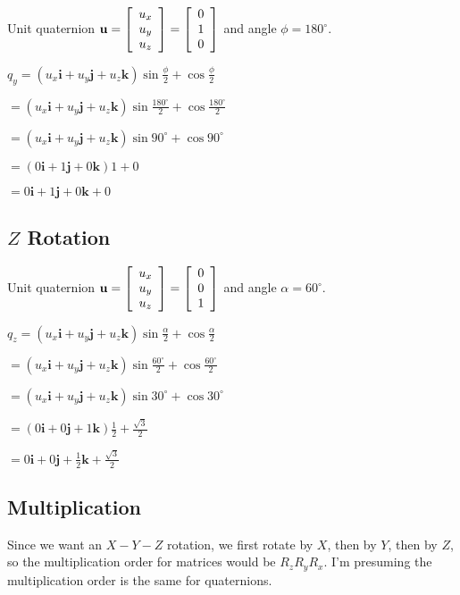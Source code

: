 \documentclass[11pt]{article}
\begin{document}
\begin{spacing}{1.2}
Unit quaternion 
$\displaystyle 
\mathbf{u} = 
\left[
	\begin{array}{c}
		u_x \cr u_y \cr u_z \cr
	\end{array}
\right]
= 
\left[
	\begin{array}{c}
		0 \cr 1 \cr 0 \cr
	\end{array}
\right]
$
and angle $\phi = 180^{\circ}$.

$q_y
 = (u_x \mathbf{i} + u_y \mathbf{j} + u_z \mathbf{k}) \sin \frac{\phi}{2} + \cos \frac{\phi}{2}
 $
 
 $ = (u_x \mathbf{i} + u_y \mathbf{j} + u_z \mathbf{k}) \sin \frac{180^{\circ}}{2} + \cos \frac{180^{\circ}}{2}$

 $ = (u_x \mathbf{i} + u_y \mathbf{j} + u_z \mathbf{k}) \sin 90^{\circ} + \cos 90^{\circ}$

 $ = (0 \mathbf{i} + 1\mathbf{j} + 0\mathbf{k}) 1 + 0$

 $ = 0 \mathbf{i} + 1\mathbf{j} + 0\mathbf{k} + 0$

\subsection{$Z$ Rotation}

Unit quaternion 
$\displaystyle 
\mathbf{u} = 
\left[
	\begin{array}{c}
		u_x \cr u_y \cr u_z \cr
	\end{array}
\right]
= 
\left[
	\begin{array}{c}
		0 \cr 0 \cr 1 \cr
	\end{array}
\right]
$
and angle $\alpha = 60^{\circ}$.

$q_z
 = (u_x \mathbf{i} + u_y \mathbf{j} + u_z \mathbf{k}) \sin \frac{\alpha}{2} + \cos \frac{\alpha}{2}
 $
 
 $ = (u_x \mathbf{i} + u_y \mathbf{j} + u_z \mathbf{k}) \sin \frac{60^{\circ}}{2} + \cos \frac{60^{\circ}}{2}$

 $ = (u_x \mathbf{i} + u_y \mathbf{j} + u_z \mathbf{k}) \sin 30^{\circ} + \cos 30^{\circ}$

 $ = (0 \mathbf{i} + 0\mathbf{j} + 1\mathbf{k}) \frac{1}{2} + \frac{\sqrt3}{2}$

 $ = 0 \mathbf{i} + 0\mathbf{j} + \frac{1}{2}\mathbf{k} + \frac{\sqrt3}{2}$


\subsection{Multiplication}

Since we want an $X-Y-Z$ rotation, we first rotate by $X$, then by $Y$, then by $Z$, so the multiplication order for matrices would be $R_z R_y R_x$.  I'm presuming the multiplication order is the same for quaternions.  


\end{spacing}
\end{document}
